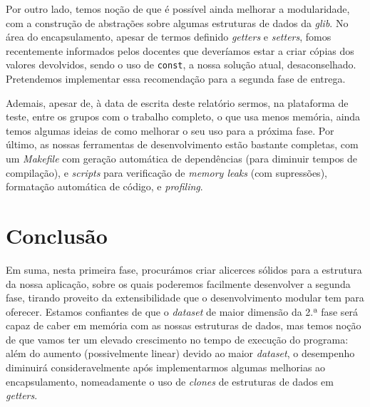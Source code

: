 \documentclass[12pt, a4paper]{article}
\begin{document}
Por outro lado, temos noção de que é possível ainda melhorar a modularidade, com a construção de
abstrações sobre algumas estruturas de dados da \emph{glib}. No área do encapsulamento, apesar de
termos definido \emph{getters} e \emph{setters}, fomos recentemente informados pelos docentes que
deveríamos estar a criar cópias dos valores devolvidos, sendo o uso de \texttt{const}, a nossa
solução atual, desaconselhado. Pretendemos implementar essa recomendação para a segunda fase de
entrega.

Ademais, apesar de, à data de escrita deste relatório sermos, na plataforma de teste, entre os
grupos com o trabalho completo, o que usa menos memória, ainda temos algumas ideias de como melhorar
o seu uso para a próxima fase. Por último, as nossas ferramentas de desenvolvimento estão bastante
completas, com um \emph{Makefile} com geração automática de dependências (para diminuir tempos de
compilação), e \emph{scripts} para verificação de \emph{memory leaks} (com supressões), formatação
automática de código, e \emph{profiling}.

\section{Conclusão}

Em suma, nesta primeira fase, procurámos criar alicerces sólidos para a estrutura da nossa
aplicação, sobre os quais poderemos facilmente desenvolver a segunda fase, tirando proveito da
extensibilidade que o desenvolvimento modular tem para oferecer. Estamos confiantes de que o
\emph{dataset} de maior dimensão da 2.ª fase será capaz de caber em memória com as nossas estruturas
de dados, mas temos noção de que vamos ter um elevado crescimento no tempo de execução do programa:
além do aumento (possivelmente linear) devido ao maior \emph{dataset}, o desempenho diminuirá
consideravelmente após implementarmos algumas melhorias ao encapsulamento, nomeadamente o uso de
\emph{clones} de estruturas de dados em \emph{getters}.
\end{document}
